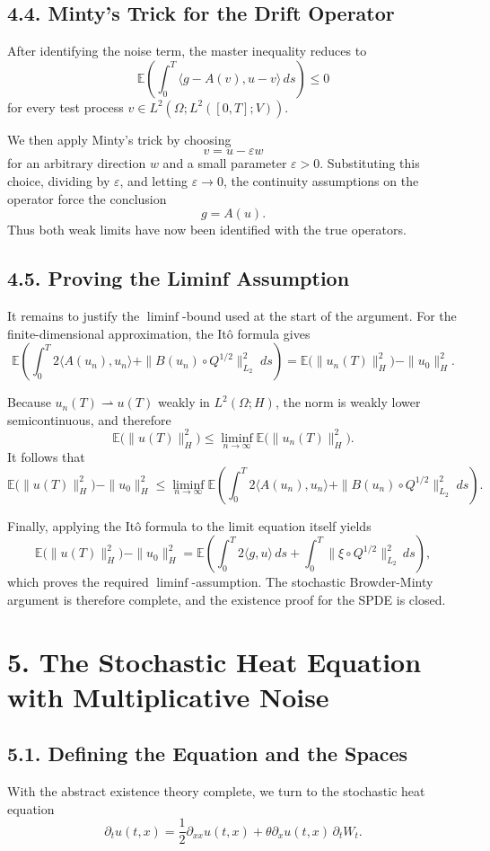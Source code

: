 \documentclass[11pt]{article}
\theoremstyle{definition}
\theoremstyle{remark}
\begin{document}
\subsection*{4.4. Minty's Trick for the Drift Operator}
After identifying the noise term, the master inequality reduces to
\[
\mathbb E\left(
\int_0^T
\langle g-A(v),u-v\rangle\,ds
\right)
\le 0
\]
for every test process \(v\in L^2(\Omega;L^2([0,T];V))\).

We then apply Minty's trick by choosing
\[
v=u-\varepsilon w
\]
for an arbitrary direction \(w\) and a small parameter \(\varepsilon>0\). Substituting this choice, dividing by \(\varepsilon\), and letting \(\varepsilon\to 0\), the continuity assumptions on the operator force the conclusion
\[
g=A(u).
\]
Thus both weak limits have now been identified with the true operators.

\subsection*{4.5. Proving the Liminf Assumption}
It remains to justify the \(\liminf\)-bound used at the start of the argument. For the finite-dimensional approximation, the It\^o formula gives
\[
\mathbb E\left(
\int_0^T
2\langle A(u_n),u_n\rangle
+
\|B(u_n)\circ Q^{1/2}\|_{L_2}^2
\;ds
\right)
=
\mathbb E\bigl(\|u_n(T)\|_H^2\bigr)-\|u_0\|_H^2.
\]

Because \(u_n(T)\rightharpoonup u(T)\) weakly in \(L^2(\Omega;H)\), the norm is weakly lower semicontinuous, and therefore
\[
\mathbb E\bigl(\|u(T)\|_H^2\bigr)
\le
\liminf_{n\to\infty}\mathbb E\bigl(\|u_n(T)\|_H^2\bigr).
\]
It follows that
\[
\mathbb E\bigl(\|u(T)\|_H^2\bigr)-\|u_0\|_H^2
\le
\liminf_{n\to\infty}
\mathbb E\left(
\int_0^T
2\langle A(u_n),u_n\rangle
+
\|B(u_n)\circ Q^{1/2}\|_{L_2}^2
\;ds
\right).
\]

Finally, applying the It\^o formula to the limit equation itself yields
\[
\mathbb E\bigl(\|u(T)\|_H^2\bigr)-\|u_0\|_H^2
=
\mathbb E\left(
\int_0^T
2\langle g,u\rangle\,ds
+
\int_0^T \|\xi\circ Q^{1/2}\|_{L_2}^2\,ds
\right),
\]
which proves the required \(\liminf\)-assumption. The stochastic Browder-Minty argument is therefore complete, and the existence proof for the SPDE is closed.

\section*{5. The Stochastic Heat Equation with Multiplicative Noise}

\subsection*{5.1. Defining the Equation and the Spaces}
With the abstract existence theory complete, we turn to the stochastic heat equation
\[
\partial_t u(t,x)=\frac12 \partial_{xx}u(t,x)+\theta \partial_x u(t,x)\,\partial_t W_t.
\]
\end{document}
